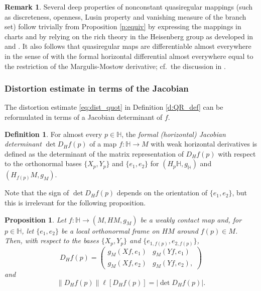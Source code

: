 \documentclass[10pt,letterpaper]{amsart}
\newtheorem{prop}[thm]{Proposition}
\theoremstyle{definition}
\newtheorem{remark}[thm]{Remark}
\newtheorem{definition}[thm]{Definition}
\numberwithin{thm}{subsection}
\numberwithin{equation}{section}
\begin{document}
\begin{remark}\label{r:Lusin}
Several deep properties of nonconstant quasiregular mappings (such as
discreteness, openness, Lusin property and vanishing measure of
the branch set) follow trivially from Proposition \ref{p:equiv} by
expressing the mappings in charts and by relying on the rich
theory in the Heisenberg group as developed in \cite{MR1778673}
and \cite{MR1630785}. It also follows that quasiregular maps
are differentiable almost everywhere in the sense of \cite{GNW,GL}
with the formal horizontal differential almost everywhere equal to
the restriction of the Margulis-Mostow derivative; cf.\ the
discussion in \cite[\S 3.2]{CLDO}.
\end{remark}

\subsubsection{Distortion estimate in terms of the Jacobian}\label{ss:JacQR}

The distortion estimate \eqref{eq:dist_quot} in Definition
\ref{d:QR_def} can be reformulated in terms of a {Jacobian
determinant} of $f$.

\begin{definition} For almost every $p\in {\mathbb H}$, the \emph{formal (horizontal) Jacobian determinant} $\det D_H f(p)$ of a map $f:{\mathbb H} \to M$ with weak horizontal derivatives is defined  as the determinant of the matrix representation of $D_H f(p)$ with respect to
 the orthonormal bases $\{X_p,Y_p\}$ and $\{e_1,e_2\}$ for $(H_p {\mathbb H},g_{\mathbb H})$ and $(H_{f(p)} M, g_M)$.
\end{definition}

Note that the sign of $\det D_H f(p)$ depends on the orientation of $\{e_1,e_2\}$, but this is irrelevant for  the following proposition.

\begin{prop}\label{p:LinAlg}
Let $f:{\mathbb H} \to (M,HM,g_M)$ be a weakly contact map and, for $p\in {\mathbb H}$, let $\{e_1,e_2\}$  be a local orthonormal frame on $HM$ around $f(p)\in M$. Then, with respect to the bases $\{X_p,Y_p\}$ and $\{e_{1,f(p)},e_{2,f(p)}\}$,
\begin{equation}\label{eq:D_Hf}
D_H f(p) = \begin{pmatrix} g_M(Xf,e_1) & g_M(Yf,e_1) \\ g_M(Xf,e_2) & g_M(Yf,e_2),\end{pmatrix}
\end{equation}
and
\begin{equation}\label{eq:det}
\|D_H f(p)\| \ell[D_H f(p)] = |\det D_H f(p)|.
\end{equation}
\end{prop}
\end{document}
